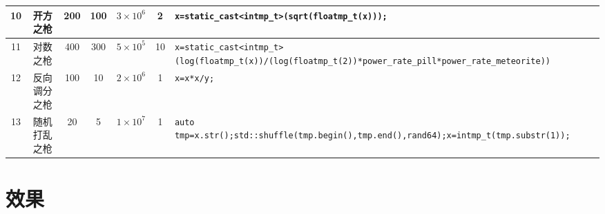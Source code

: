 \documentclass[UTF8,fontset=none,linespread=1.2]{ctexart}
\begin{document}
\begin{center}
\begin{longtable}{|c|c|c|c|c|c|>{\centering\arraybackslash}m{10cm}|}
10&开方之枪&200&100&$3\times10^6$&2&\lstinline|x=static_cast<intmp_t>(sqrt(floatmp_t(x)));|\\\hline
11&对数之枪&400&300&$5\times10^5$&10&\lstinline|x=static_cast<intmp_t>(log(floatmp_t(x))/(log(floatmp_t(2))*power_rate_pill*power_rate_meteorite))|\\\hline
12&反向调分之枪&100&10&$2\times10^6$&1&\lstinline|x=x*x/y;|\\\hline
13&随机打乱之枪&20&5&$1\times10^7$&1&\lstinline|auto tmp=x.str();std::shuffle(tmp.begin(),tmp.end(),rand64);x=intmp_t(tmp.substr(1));|\\\hline
\end{longtable}
\end{center}
\section{效果}
\end{document}

